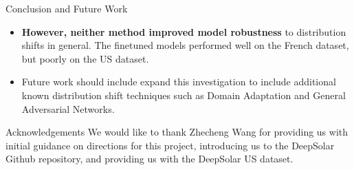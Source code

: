 \documentclass[final]{beamer}
\newlength{\colwidth}
\begin{document}
\begin{frame}[t]
\begin{columns}[t]
\begin{column}{\colwidth}
\begin{block}{Conclusion and Future Work}
\begin{itemize}
    \item \textbf{However, neither method improved model robustness} to distribution shifts in general. The finetuned models performed well on the French dataset, but poorly on the US dataset. \\[20pt]
    
    \item Future work should include expand this investigation to include additional known distribution shift techniques such as Domain Adaptation and General Adversarial Networks.

\end{itemize}

\end{block}



\begin{block}{Acknowledgements}
We would like to thank Zhecheng Wang for providing us with initial guidance on directions for this project, introducing us to the DeepSolar Github repository, and providing us with the DeepSolar US dataset. 
\end{block}


    


\end{column}
\end{columns}
\end{frame}
\end{document}
